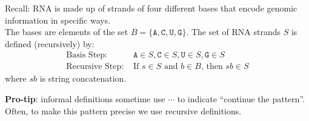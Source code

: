 \documentclass[12pt, oneside]{article}
\newcommand{\A}[0]{\texttt{A}}
\newcommand{\C}[0]{\texttt{C}}
\newcommand{\G}[0]{\texttt{G}}
\newcommand{\U}[0]{\texttt{U}}
\begin{document}
\vfill

Recall: RNA is made up of strands of four different bases that encode genomic information
in specific ways.\\
The bases are elements of the set 
$B  = \{\A, \C, \U, \G \}$. The set of RNA strands $S$ is defined (recursively) by:
\[
\begin{array}{ll}
\textrm{Basis Step: } & \A \in S, \C \in S, \U \in S, \G \in S \\
\textrm{Recursive Step: } & \textrm{If } s \in S\textrm{ and }b \in B \textrm{, then }sb \in S
\end{array}
\]
where $sb$ is string concatenation.

\vfill
\newpage
{\bf Pro-tip}: informal definitions sometime use $\cdots$ to indicate ``continue the pattern''. Often, 
to make this pattern precise we use recursive definitions.

\vspace{-20pt}
\end{document}
